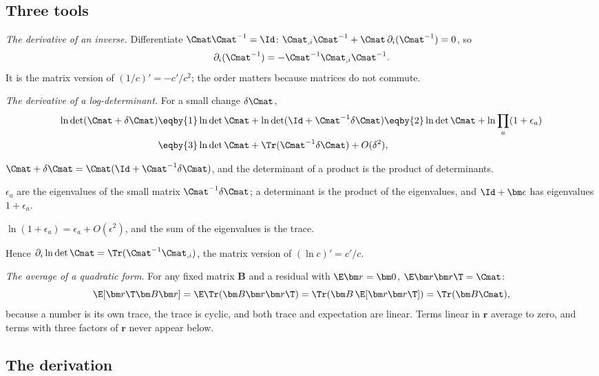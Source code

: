 \subsection{Three tools}
\label{10a:sec:gauss-tools}

\emph{The derivative of an inverse.} Differentiate $\Cmat\Cmat^{-1}=\Id$: $\Cmat_{,i}\Cmat^{-1}+\Cmat\,\partial_i(\Cmat^{-1})=0$,
so
\begin{equation}
  \partial_i(\Cmat^{-1})=-\Cmat^{-1}\Cmat_{,i}\Cmat^{-1}.
  \label{10a:eq:dinv}
\end{equation}
It is the matrix version of $(1/c)'=-c'/c^2$; the order matters because matrices do not commute.

\emph{The derivative of a log-determinant.} For a small change $\delta\Cmat$,
\begin{align}
  \ln\det(\Cmat+\delta\Cmat)
  &\eqby{1}\ln\det\Cmat+\ln\det(\Id+\Cmat^{-1}\delta\Cmat)
  \eqby{2}\ln\det\Cmat+\ln\prod_a(1+\epsilon_a)
  \nonumber\\
  &\eqby{3}\ln\det\Cmat+\Tr(\Cmat^{-1}\delta\Cmat)+O(\delta^2),
  \label{10a:eq:dlogdet}
\end{align}
\begin{explain}
  \item $\Cmat+\delta\Cmat=\Cmat(\Id+\Cmat^{-1}\delta\Cmat)$, and the determinant of a product is the product of
        determinants.
  \item $\epsilon_a$ are the eigenvalues of the small matrix $\Cmat^{-1}\delta\Cmat$; a determinant is the product
        of the eigenvalues, and $\Id+\bm\epsilon$ has eigenvalues $1+\epsilon_a$.
  \item $\ln(1+\epsilon_a)=\epsilon_a+O(\epsilon^2)$, and the sum of the eigenvalues is the trace.
\end{explain}
Hence $\partial_i\ln\det\Cmat=\Tr(\Cmat^{-1}\Cmat_{,i})$, the matrix version of $(\ln c)'=c'/c$.

\emph{The average of a quadratic form.} For any fixed matrix $\bm B$ and a residual with $\E\bm r=\bm0$,
$\E\bm r\bm r\T=\Cmat$:
\begin{equation}
  \E[\bm r\T\bm B\bm r]=\E\Tr(\bm B\bm r\bm r\T)=\Tr(\bm B\,\E[\bm r\bm r\T])=\Tr(\bm B\Cmat),
  \label{10a:eq:quadform}
\end{equation}
because a number is its own trace, the trace is cyclic, and both trace and expectation are linear.
Terms linear in $\bm r$ average to zero, and terms with three factors of $\bm r$ never appear below.

\subsection{The derivation}
\label{10a:sec:gauss-derive}

